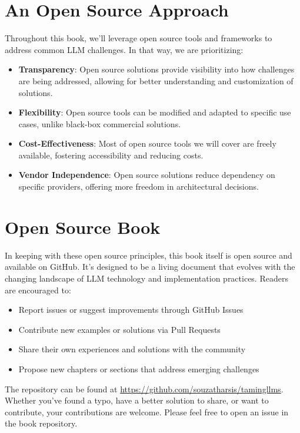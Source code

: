 \section{An Open Source Approach}

Throughout this book, we'll leverage open source tools and frameworks to address common LLM challenges. In that way, we are prioritizing:

\begin{itemize}
\item \textbf{Transparency}: Open source solutions provide visibility into how challenges are being addressed, allowing for better understanding and customization of solutions.
\item \textbf{Flexibility}: Open source tools can be modified and adapted to specific use cases, unlike black-box commercial solutions.
\item \textbf{Cost-Effectiveness}: Most of open source tools we will cover are freely available, fostering accessibility and reducing costs.
\item \textbf{Vendor Independence}: Open source solutions reduce dependency on specific providers, offering more freedom in architectural decisions.
\end{itemize}

\section{Open Source Book}

In keeping with these open source principles, this book itself is open source and available on GitHub. It's designed to be a living document that evolves with the changing landscape of LLM technology and implementation practices. Readers are encouraged to:

\begin{itemize}
\item Report issues or suggest improvements through GitHub Issues
\item Contribute new examples or solutions via Pull Requests
\item Share their own experiences and solutions with the community
\item Propose new chapters or sections that address emerging challenges
\end{itemize}

The repository can be found at \url{https://github.com/souzatharsis/tamingllms}. Whether you've found a typo, have a better solution to share, or want to contribute, your contributions are welcome. Please feel free to open an issue in the book repository.

